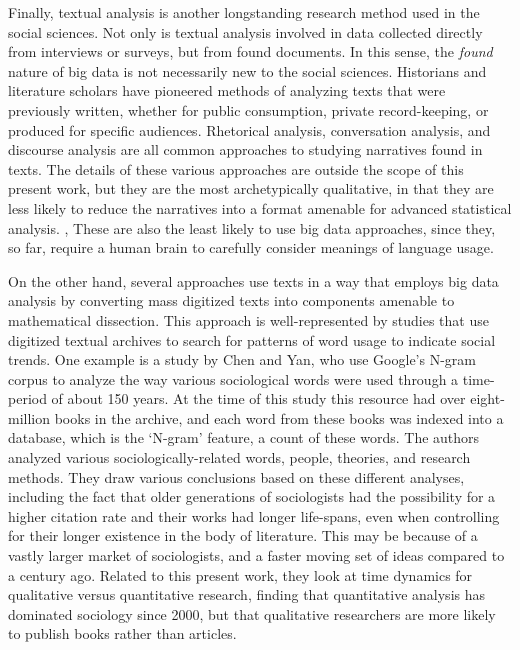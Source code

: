 \documentclass[sigconf]{acmart}
\begin{document}
Finally, textual analysis is another longstanding research method used in the social sciences.  Not only is textual analysis involved in data collected directly from interviews or surveys, but from found documents.  In this sense, the {\em found} nature of big data is not necessarily new to the social sciences.  Historians and literature scholars have pioneered methods of analyzing texts that were previously written, whether for public consumption, private record-keeping, or produced for specific audiences.  Rhetorical analysis, conversation analysis, and discourse analysis are all common approaches to studying narratives found in texts. The details of these various approaches are outside the scope of this present work, but they are the most archetypically qualitative, in that they are less likely to reduce the narratives into a format amenable for advanced statistical analysis. \cite{bryman16}, \cite{sagi14}  These are also the least likely to use big data approaches, since they, so far, require a human brain to carefully consider meanings of language usage.

On the other hand, several approaches use texts in a way that employs big data analysis by converting mass digitized texts into components amenable to mathematical dissection.  This approach is well-represented by studies that use digitized textual archives to search for patterns of word usage to indicate social trends.  One example is a study by Chen and Yan, who use Google's N-gram corpus to analyze the way various sociological words were used through a time-period of about 150 years. \cite{chen16}  At the time of this study this resource had over eight-million books in the archive, and each word from these books was indexed into a database, which is the `N-gram' feature, a count of these words.  The authors analyzed various sociologically-related words, people, theories, and research methods. They draw various conclusions based on these different analyses, including the fact that older generations of sociologists had the possibility for a higher citation rate and their works had longer life-spans, even when controlling for their longer existence in the body of literature.  This may be because of a vastly larger market of sociologists, and a faster moving set of ideas compared to a century ago.  Related to this present work, they look at time dynamics for qualitative versus quantitative research, finding that quantitative analysis has dominated sociology since 2000, but that qualitative researchers are more likely to publish books rather than articles. \cite{chen16}
\end{document}
